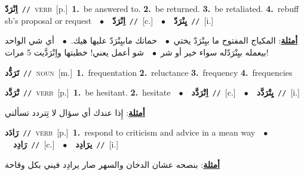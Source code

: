 \documentclass[10pt,a4paper,twoside]{article} %
\begin{document}
\begin{multicols}{2}
{\setlength\topsep{0pt}\textbf{\foreignlanguage{arabic}{اِنْرَدّ}}\ {\color{gray}\texttt{//}\color{black}}\ \textsc{verb}\ [p.]\ \textbf{1.}~be answered to.  \textbf{2.}~be returned.  \textbf{3.}~be retaliated.  \textbf{4.}~rebuff sb's proposal or request\ \ $\bullet$\ \ \setlength\topsep{0pt}\textbf{\foreignlanguage{arabic}{اِنْرَدّ}}\ {\color{gray}\texttt{//}\color{black}}\ [c.]\ \ $\bullet$\ \ \setlength\topsep{0pt}\textbf{\foreignlanguage{arabic}{يِنْرَدّ}}\ {\color{gray}\texttt{//}\color{black}}\ [i.]\  \begin{flushright}\color{gray}\foreignlanguage{arabic}{\textbf{\underline{\foreignlanguage{arabic}{أمثلة}}}: المكياج المفتوح ما بيِنْرَدّ يختي\ $\bullet$\ \  حماتك مابيِنْرَدّ عليها هيك.\ $\bullet$\ \  أي شي الواحد بيعمله بيِنْرَدّله سواء خير أو شر\ $\bullet$\ \  شو أعمل يعني! خطبتها واِنْرَدَّيت 5 مرات!}\end{flushright}\color{black}} \vspace{2mm}

{\setlength\topsep{0pt}\textbf{\foreignlanguage{arabic}{تَرَدُّد}}\ {\color{gray}\texttt{//}\color{black}}\ \textsc{noun}\ [m.]\ \textbf{1.}~frequentation  \textbf{2.}~reluctance  \textbf{3.}~frequency  \textbf{4.}~frequencies\ } \vspace{2mm}

{\setlength\topsep{0pt}\textbf{\foreignlanguage{arabic}{تْرَدَّد}}\ {\color{gray}\texttt{//}\color{black}}\ \textsc{verb}\ [p.]\ \textbf{1.}~be hesitant.  \textbf{2.}~hesitate\ \ $\bullet$\ \ \setlength\topsep{0pt}\textbf{\foreignlanguage{arabic}{اِتْرَدَّد}}\ {\color{gray}\texttt{//}\color{black}}\ [c.]\ \ $\bullet$\ \ \setlength\topsep{0pt}\textbf{\foreignlanguage{arabic}{يِتْرَدَّد}}\ {\color{gray}\texttt{//}\color{black}}\ [i.]\  \begin{flushright}\color{gray}\foreignlanguage{arabic}{\textbf{\underline{\foreignlanguage{arabic}{أمثلة}}}: إِذا عندك أي سؤال لا تِتردد تسألني}\end{flushright}\color{black}} \vspace{2mm}

{\setlength\topsep{0pt}\textbf{\foreignlanguage{arabic}{رَادَد}}\ {\color{gray}\texttt{//}\color{black}}\ \textsc{verb}\ [p.]\ \textbf{1.}~respond to criticism and advice in a mean way\ \ $\bullet$\ \ \setlength\topsep{0pt}\textbf{\foreignlanguage{arabic}{رَادِد}}\ {\color{gray}\texttt{//}\color{black}}\ [c.]\ \ $\bullet$\ \ \setlength\topsep{0pt}\textbf{\foreignlanguage{arabic}{يرَادِد}}\ {\color{gray}\texttt{//}\color{black}}\ [i.]\  \begin{flushright}\color{gray}\foreignlanguage{arabic}{\textbf{\underline{\foreignlanguage{arabic}{أمثلة}}}: بنصحه عشان الدخان والسهر صار يرادِد فيني بكل وقاحة}\end{flushright}\color{black}} \vspace{2mm}


\end{multicols}
\end{document}

